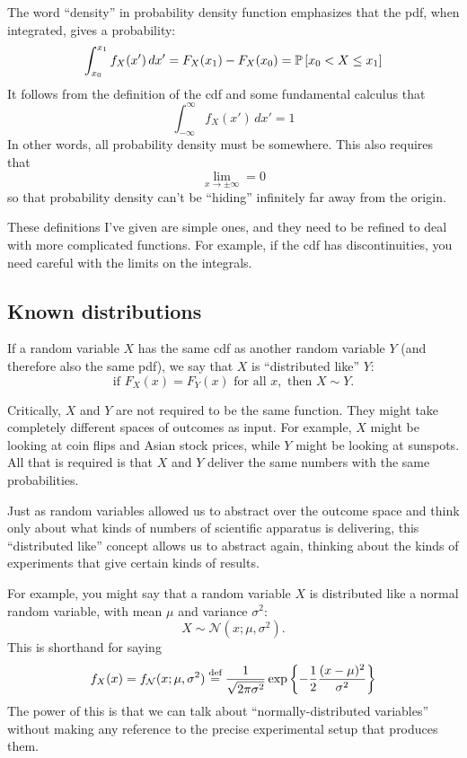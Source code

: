 The word ``density'' in probability density function emphasizes that the pdf,
when integrated, gives a probability:
\begin{equation}\label{eq:integrated_pdf}
\int_{x_0}^{x_1} f_X(x') \,dx' = F_X(x_1) - F_X(x_0) = \mathbb{P}\left[{x_0 < X \leq x_1}\right]
\end{equation}
It follows from the definition of the cdf and
some fundamental calculus that
\begin{equation}
\int_{-\infty}^\infty f_X(x') \,dx' = 1
\end{equation}
In other words, all probability density must be somewhere. This also requires that
\begin{equation}
\lim_{x \to \pm \infty} = 0
\end{equation}
so that probability density can't be ``hiding'' infinitely far away from the origin.

These definitions I've given are simple ones, and they need to be refined to
deal with more complicated functions. For example, if the cdf has
discontinuities, you need careful with the limits on the integrals.

\subsection{Known distributions}

If a random variable $X$ has the same cdf as another random variable $Y$ (and
therefore also the same pdf), we say that $X$ is ``distributed like'' $Y$:
$$
\text{if } F_X(x) = F_Y(x) \text{ for all } x, \text{ then } X \sim Y.
$$

Critically, $X$ and $Y$ are not required to be the same function. They might
take completely different spaces of outcomes as input. For example, $X$ might
be looking at coin flips and Asian stock prices, while $Y$ might be looking at
sunspots. All that is required is that $X$ and $Y$ deliver the same numbers
with the same probabilities.

Just as random variables allowed us to abstract over the outcome space and
think only about what kinds of numbers of scientific apparatus is delivering,
this ``distributed like'' concept allows us to abstract again, thinking about
the kinds of experiments that give certain kinds of results.

For example, you might say that a random variable $X$ is distributed like a
normal random variable, with mean $\mu$ and variance $\sigma^2$:
$$
X \sim \mathcal{N}(x; \mu, \sigma^2).
$$
This is shorthand for saying
\begin{equation*}
f_X(x) = f_\mathcal{N}(x; \mu, \sigma^2) \stackrel{\text{def}}{=}
  \frac{1}{\sqrt{2\pi\sigma^2}} \exp \left\{-\frac{1}{2} \frac{(x-\mu)^2}{\sigma^2} \right\}
\end{equation*}
The power of this is that we can talk about ``normally-distributed variables''
without making any reference to the precise experimental setup that produces
them.

